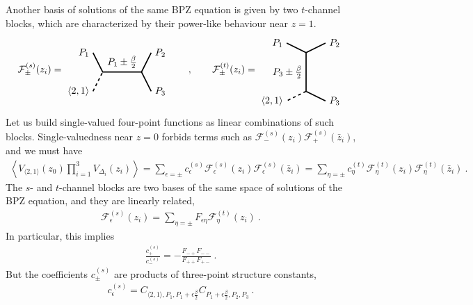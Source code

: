 \documentclass[12pt, a4paper]{article}
\theoremstyle{break}
\begin{document}
Another basis of solutions of the same BPZ equation is given by two $t$-channel blocks, which are characterized by their power-like behaviour near $z=1$.
\begin{align}
 \mathcal{F}^{(s)}_\pm(z_i)  =  
 \begin{tikzpicture}[baseline=(current  bounding  box.center), very thick, scale = .35]
\draw (-1,2) node [left] {$P_1$} -- (0,0) -- node [above] {$P_1\pm \frac{\beta}{2}$} (4,0) -- (5,2) node [right] {$P_2$};
\draw[dashed] (-1,-2) node [left] {$\langle 2,1 \rangle$} -- (0,0);
\draw (4,0) -- (5,-2) node [right] {$P_3$};
\end{tikzpicture}
\qquad , \qquad 
\mathcal{F}^{(t)}_\pm(z_i)  =  
 \begin{tikzpicture}[baseline=(current  bounding  box.center), very thick, scale = .35]
 \draw (-2,3) node [left] {$P_1$} -- (0,2) -- node [left] {$P_3\pm \frac{\beta}{2}$} (0,-2);
 \draw[dashed] (0, -2) -- (-2, -3) node [left] {$\langle 2,1 \rangle$};
\draw (0,2) -- (2,3) node [right] {$P_2$};
\draw (0,-2) -- (2, -3) node [right] {$P_3$};
\end{tikzpicture}
\label{gpic}
\end{align}
Let us build single-valued four-point functions as linear combinations of such blocks. Single-valuedness near $z=0$ forbids terms such as $\mathcal{F}^{(s)}_{-}(z_i) \mathcal{F}^{(s)}_{+}(\bar z_i)$, and we must have 
\begin{align}
 \left< V_{\langle 2, 1 \rangle}(z_0) \prod_{i=1}^3 V_{\Delta_i}(z_i) \right> = \sum_{\epsilon=\pm} c^{(s)}_{\epsilon} \mathcal{F}^{(s)}_{\epsilon}(z_i) \mathcal{F}^{(s)}_{\epsilon}(\bar z_i) = \sum_{\eta=\pm} c^{(t)}_{\eta} \mathcal{F}^{(t)}_{\eta}(z_i) \mathcal{F}^{(t)}_{\eta}(\bar z_i)\ .
 \label{gz}
\end{align}
The $s$- and $t$-channel blocks are two bases of the same space of solutions of the BPZ equation, and they are linearly related,
\begin{align}
 \mathcal{F}^{(s)}_{\epsilon}(z_i) = \sum_{\eta=\pm} F_{\epsilon\eta} \mathcal{F}^{(t)}_{\eta}(z_i)\ .
\end{align}
In particular, this implies 
\begin{align}
 \frac{c_{+}^{(s)}}{c_{-}^{(s)}} = -\frac{F_{-+}F_{--}}{F_{++}F_{+-}} \ .
 \label{eq:coc}
\end{align}
But the coefficients $c_\pm^{(s)}$ are products of three-point structure constants,
\begin{align}
 c_\epsilon^{(s)} = C_{\langle 2,1\rangle, P_1, P_1+\epsilon\frac{\beta}{2}} C_{P_1+\epsilon\frac{\beta}{2}, P_2,P_3}\ .
\end{align}
\end{document}
